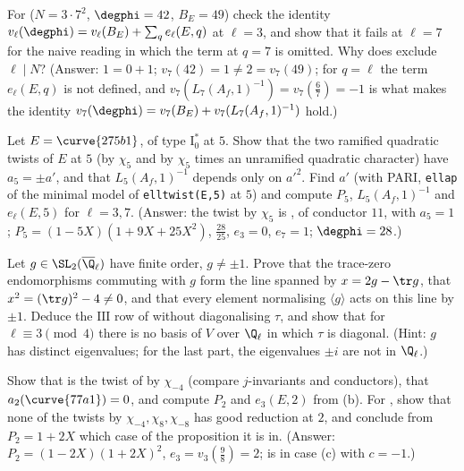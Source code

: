 \begin{exercise}\label{ex:lfunctions:ex-147}
For  ($N=3\cdot7^2$, $\degphi=42$, $B_E=49$) check the identity $v_\ell(\degphi)=v_\ell(B_E)+\sum_qe_\ell(E,q)$ at $\ell=3$, and show that it fails at $\ell=7$ for the naive reading
in which the term at $q=7$ is omitted. Why does  exclude $\ell\mid N$? (Answer: $1=0+1$; $v_7(42)=1\ne2=v_7(49)$; for $q=\ell$ the term $e_\ell(E,q)$
is not defined, and $v_7(L_7(A_f,1)^{-1})=v_7(\frac67)=-1$ is what makes the identity $v_7(\degphi)=v_7(B_E)+v_7(L_7(A_f,1)^{-1})$ hold.)
\end{exercise}

\begin{exercise}\label{ex:lfunctions:ex-275}
Let $E=\curve{275b1}$, of type $\mathrm I_0^*$ at $5$. Show that the two ramified quadratic twists of $E$ at $5$ (by $\chi_5$ and by $\chi_5$ times an unramified quadratic character) have
$a_5=\pm a'$, and that $L_5(A_f,1)^{-1}$ depends only on $a'^2$. Find $a'$ (with PARI, \texttt{ellap} of the minimal model of \texttt{elltwist(E,5)} at $5$) and compute $P_5$, $L_5(A_f,1)^{-1}$
and $e_\ell(E,5)$ for $\ell=3,7$. (Answer: the twist by $\chi_5$ is , of conductor $11$, with $a_5=1$; $P_5=(1-5X)(1+9X+25X^2)$, $\frac{28}{25}$, $e_3=0$, $e_7=1$; $\degphi=28$.)
\end{exercise}

\begin{exercise}\label{ex:lfunctions:ex-commutant}
Let $g\in\SL_2(\overline\Q_\ell)$ have finite order, $g\ne\pm1$. Prove that the trace-zero endomorphisms commuting with $g$ form the line spanned by $x=2g-\tr g$, that $x^2=(\tr g)^2-4\ne0$,
and that every element normalising $\langle g\rangle$ acts on this line by $\pm1$. Deduce the $\mathrm{III}$ row of  without diagonalising $\tau$, and show that for
$\ell\equiv3\pmod4$ there is no basis of $V$ over $\Q_\ell$ in which $\tau$ is diagonal. (Hint: $g$ has distinct eigenvalues; for the last part, the eigenvalues $\pm i$ are not in
$\Q_\ell$.)
\end{exercise}

\begin{exercise}\label{ex:lfunctions:ex-wild2}
Show that  is the twist of  by $\chi_{-4}$ (compare $j$-invariants and conductors), that $a_2(\curve{77a1})=0$, and compute $P_2$ and $e_3(E,2)$ from
(b). For , show that none of the twists by $\chi_{-4},\chi_8,\chi_{-8}$ has good reduction at $2$, and conclude from $P_2=1+2X$ which case of the
proposition it is in. (Answer: $P_2=(1-2X)(1+2X)^2$, $e_3=v_3(\frac98)=2$;  is in case (c) with $c=-1$.)
\end{exercise}

